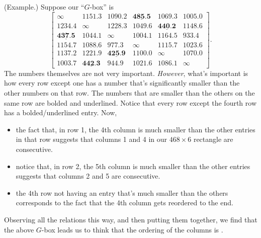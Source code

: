 \documentclass[letterpaper]{article}
\newcommand{\0}{\mathbf{0}}
\begin{document}
\begin{mdframed}
    (Example.) Suppose our ``$G$-box'' is 
    \[\begin{bmatrix}
        \infty & 1151.3 & 1090.2 & \underline{\textbf{485.5}} & 1069.3 & 1005.0 \\ 
        1234.4 & \infty & 1228.3 & 1049.6 & \underline{\textbf{440.2}} & 1148.6 \\ 
        \underline{\textbf{437.5}} & 1044.1 & \infty & 1004.1 & 1164.5 & 933.4 \\ 
        1154.7 & 1088.6 & 977.3 & \infty & 1115.7 & 1023.6 \\ 
        1137.2 & 1221.9 & \underline{\textbf{425.9}} & 1100.0 & \infty & 1070.0 \\ 
        1003.7 & \underline{\textbf{442.3}} & 944.9 & 1021.6 & 1086.1 & \infty
    \end{bmatrix}.\]
    The numbers themselves are not very important. \emph{However}, what's important is how every row except one has a number that's significantly smaller than the other numbers on that row. The numbers that are smaller than the others on the same row are bolded and underlined. Notice that every row except the fourth row has a bolded/underlined entry. Now, 
    \begin{itemize}
        \item the fact that, in row 1, the 4th column is much smaller than the other entries in that row suggests that columns 1 and 4 in our $468 \times 6$ rectangle are consecutive.
        \item notice that, in row 2, the 5th column is much smaller than the other entries suggests that columns 2 and 5 are consecutive.
        \item the 4th row not having an entry that's much smaller than the others corresponds to the fact that the 4th column gets reordered to the end. 
    \end{itemize} 
    Observing all the relations this way, and then putting them together, we find that the above $G$-box leads us to think that the ordering of the columns is .

    \bigskip 


\end{mdframed}
\end{document}
